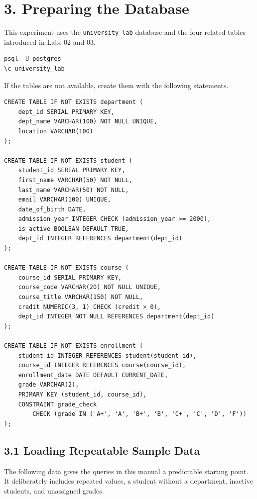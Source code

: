 \documentclass[12pt,a4paper]{article}
\begin{document}
\section*{3. Preparing the Database}
This experiment uses the \texttt{university\_lab} database and the four related tables introduced
in Labs 02 and 03.

\begin{verbatim}
psql -U postgres
\c university_lab
\end{verbatim}

If the tables are not available, create them with the following statements.

\begin{verbatim}
CREATE TABLE IF NOT EXISTS department (
    dept_id SERIAL PRIMARY KEY,
    dept_name VARCHAR(100) NOT NULL UNIQUE,
    location VARCHAR(100)
);

CREATE TABLE IF NOT EXISTS student (
    student_id SERIAL PRIMARY KEY,
    first_name VARCHAR(50) NOT NULL,
    last_name VARCHAR(50) NOT NULL,
    email VARCHAR(100) UNIQUE,
    date_of_birth DATE,
    admission_year INTEGER CHECK (admission_year >= 2000),
    is_active BOOLEAN DEFAULT TRUE,
    dept_id INTEGER REFERENCES department(dept_id)
);

CREATE TABLE IF NOT EXISTS course (
    course_id SERIAL PRIMARY KEY,
    course_code VARCHAR(20) NOT NULL UNIQUE,
    course_title VARCHAR(150) NOT NULL,
    credit NUMERIC(3, 1) CHECK (credit > 0),
    dept_id INTEGER NOT NULL REFERENCES department(dept_id)
);

CREATE TABLE IF NOT EXISTS enrollment (
    student_id INTEGER REFERENCES student(student_id),
    course_id INTEGER REFERENCES course(course_id),
    enrollment_date DATE DEFAULT CURRENT_DATE,
    grade VARCHAR(2),
    PRIMARY KEY (student_id, course_id),
    CONSTRAINT grade_check
        CHECK (grade IN ('A+', 'A', 'B+', 'B', 'C+', 'C', 'D', 'F'))
);
\end{verbatim}

\subsection*{3.1 Loading Repeatable Sample Data}
The following data gives the queries in this manual a predictable starting point. It deliberately
includes repeated values, a student without a department, inactive students, and unassigned
grades.
\end{document}
